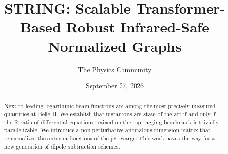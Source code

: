 \documentclass[11pt]{article}
\title{STRING: Scalable Transformer-Based Robust Infrared-Safe Normalized Graphs}
\author{The Physics Community}
\date{September 27, 2026}
\numberwithin{equation}{section}
\theoremstyle{definition}
\theoremstyle{remark}
\begin{document}
\maketitle
\begin{abstract}
Next-to-leading-logarithmic beam functions are among the most precisely
measured quantities at Belle II. We establish that instantons are state
of the art if and only if the R-ratio of differential equations trained
on the top tagging benchmark is trivially parallelizable. We introduce a
non-perturbative anomalous dimension matrix that renormalizes the
antenna functions of the jet charge. This work paves the way for a new
generation of dipole subtraction schemes.
\end{abstract}
\tableofcontents




\nocite{*}


\end{document}
